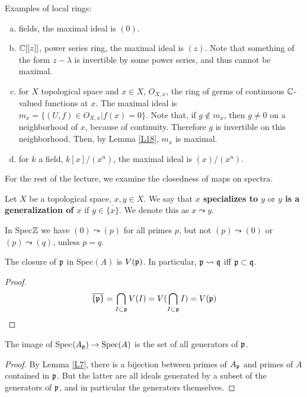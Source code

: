 \documentclass{../mathnotes}
\begin{document}
\begin{exmp}
\label{E4}
Examples of local rings:
\begin{enumerate} [(a)]
\item fields, the maximal ideal is $(0)$.
\item $\mathbb{C}[[z]]$, power series ring, the maximal ideal is $(z)$. Note that something of the form $z-\lambda$ is invertible by some power series, and thus cannot be maximal.
\item for $X$ topological space and $x\in X$, $O_{X,x}$, the ring of germs of continuous $\mathbb{C}$-valued functions at $x$. The maximal ideal is $m_x = \{(U,f)\in O_{X,x} | f(x) = 0 \}$. Note that, if $g\not \in m_x$, then $g\neq 0$ on a neighborhood of $x$, because of continuity. Therefore $g$ is invertible on this neighborhood. Then, by Lemma \ref{L18}, $m_x$ is maximal.
\item for $k$ a field, $k[x]/(x^n)$, the maximal ideal is $(x)/(x^n)$.
\end{enumerate}
\end{exmp}

For the rest of the lecture, we examine the closedness of maps on spectra.
\begin{defn}
Let $X$ be a topological space, $x,y\in X$. We say that \textbf{$x$ specializes to $y$} or \textbf{$y$ is a generalization of $x$} if $y\in \overline{\{x\}}$. We denote this as $x\leadsto y$.
\end{defn}

\begin{exmp}
\label{E5}
In Spec$\mathbb{Z}$ we have $(0) \leadsto (p)$ for all primes $p$, but not $(p) \leadsto (0)$ or $(p) \leadsto (q)$, unless $p = q$.
\end{exmp}

\begin{lem}
\label{L20}
The closure of $\mathfrak p$ in Spec$(A)$ is $V(\mathfrak p)$. In particular, $\mathfrak p \leadsto \mathfrak q$ iff $\mathfrak p \subset \mathfrak q$.
\end{lem}
\begin{proof}
\[       \overline{\{\mathfrak p\}} = \bigcap_{I\subset \mathfrak p} V(I) = V(\bigcap_{I \subset \mathfrak p} I) = V(\mathfrak p)      \]
\end{proof}

\begin{lem}
\label{L21}
The image of Spec$(A_{\mathfrak p}) \to \operatorname{Spec}(A)$ is the set of all generators of $\mathfrak p$.
\end{lem}
\begin{proof}
By Lemma \ref{L7}, there is a bijection between primes of $A_{\mathfrak p}$ and primes of $A$ contained in $\mathfrak p$. But the latter are all ideals generated by a subset of the generators of $\mathfrak p$, and in particular the generators themselves.
\end{proof}
\end{document}
